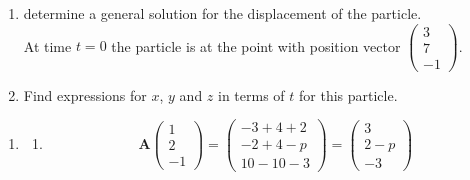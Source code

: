 \documentclass[leqno]{article}
\begin{document}
\begin{enumerate}[
  label=\textbf{\arabic*.},
  leftmargin=*,
  topsep=0pt,
  partopsep=0pt,
  parsep=0pt
]
\begin{enumerate}[label=\textbf{(\alph*)}]
\begin{enumerate}[label=(\roman*)]
    By considering
    \[\begin{pmatrix} u \\ v \\ w \end{pmatrix} = \mathbf{P}^{-1} \begin{pmatrix} x \\ y \\ z \end{pmatrix} \quad \text{so that} \quad \begin{pmatrix} \dot{u} \\ \dot{v} \\ \dot{w} \end{pmatrix} = \mathbf{P}^{-1} \begin{pmatrix} \dot{x} \\ \dot{y} \\ \dot{z} \end{pmatrix}\]
    \item determine a general solution for the displacement of the particle.  \\
    At time $t = 0$ the particle is at the point with position vector $\begin{pmatrix} 3 \\ 7 \\ -1 \end{pmatrix}$. \\
    \item Find expressions for $x$, $y$ and $z$ in terms of $t$ for this particle.  \\
  \end{enumerate}
\end{enumerate}

\vspace*{10pt}

\begin{djsSolution}
\begin{enumerate}[label=\textbf{(\alph*)}, start=1]
  \item
  \begin{enumerate}[label=(\roman*), start=1]
    \item
\[
\mathbf{A}\begin{pmatrix}1\\ 2\\ -1\end{pmatrix}=\begin{pmatrix}-3+4+2\\ -2+4-p\\ 10-10-3\end{pmatrix}=\begin{pmatrix}3\\ 2-p\\ -3\end{pmatrix}
\]


\end{enumerate}
\end{enumerate}
\end{djsSolution}
\end{enumerate}
\end{document}
